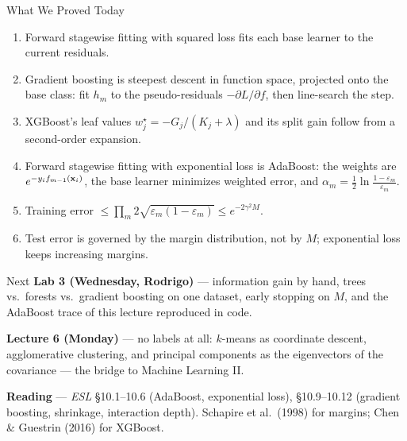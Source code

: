 \documentclass[11pt,aspectratio=169]{beamer}
\begin{document}
\begin{frame}{What We Proved Today}
\begin{enumerate}
  \item Forward stagewise fitting with squared loss fits each base learner to the current residuals.
  \item Gradient boosting is steepest descent in function space, projected onto the base class:
        fit $h_m$ to the pseudo-residuals $-\partial L/\partial f$, then line-search the step.
  \item XGBoost's leaf values $w_j^\star=-G_j/(K_j+\lambda)$ and its split gain follow from a second-order expansion.
  \item Forward stagewise fitting with exponential loss is AdaBoost: the weights are $e^{-y_if_{m-1}(\mathbf{x}_i)}$,
        the base learner minimizes weighted error, and $\alpha_m=\tfrac12\ln\frac{1-\varepsilon_m}{\varepsilon_m}$.
  \item Training error $\le\prod_m2\sqrt{\varepsilon_m(1-\varepsilon_m)}\le e^{-2\gamma^2M}$.
  \item Test error is governed by the margin distribution, not by $M$; exponential loss keeps increasing margins.
\end{enumerate}
\end{frame}

\begin{frame}{Next}
\textbf{Lab 3 (Wednesday, Rodrigo)} --- information gain by hand, trees vs.\ forests vs.\ gradient boosting on
one dataset, early stopping on $M$, and the AdaBoost trace of this lecture reproduced in code.
\vspace{8pt}

\textbf{Lecture 6 (Monday)} --- no labels at all: $k$-means as coordinate descent, agglomerative clustering,
and principal components as the eigenvectors of the covariance --- the bridge to Machine Learning II.
\vspace{8pt}

\textbf{Reading} --- \emph{ESL} \S10.1--10.6 (AdaBoost, exponential loss), \S10.9--10.12 (gradient boosting,
shrinkage, interaction depth). Schapire et al.\ (1998) for margins; Chen \& Guestrin (2016) for XGBoost.
\end{frame}
\end{document}
